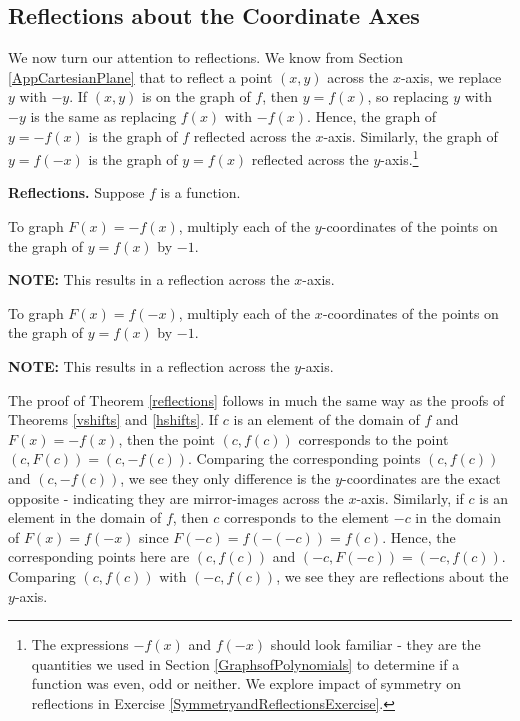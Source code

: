 \documentclass{ximera}
\begin{document}
\subsection{Reflections about the Coordinate Axes}

We now turn our attention to reflections. We know from Section \ref{AppCartesianPlane} that to reflect a point $(x,y)$ across the $x$-axis, we replace $y$ with $-y$.  If $(x,y)$ is on the graph of $f$, then $y=f(x)$, so replacing $y$ with $-y$ is the same as replacing $f(x)$ with $-f(x)$.  Hence, the graph of $y=-f(x)$ is the graph of $f$ reflected across the $x$-axis.  Similarly, the graph of $y=f(-x)$ is the graph of $y = f(x)$ reflected across the $y$-axis.\footnote{The expressions $-f(x)$ and $f(-x)$ should look familiar - they are the quantities we used in Section \ref{GraphsofPolynomials} to determine if a function was even, odd or neither.  We explore impact of symmetry on reflections in Exercise \ref{SymmetryandReflectionsExercise}.}   

\smallskip

\colorbox{ResultColor}{\bbm


\begin{theorem} \label{reflections}\textbf{Reflections.}  Suppose $f$ is a function. 

  To graph $F(x)=-f(x)$,  multiply each of the $y$-coordinates of the points on the graph of $y=f(x)$ by $-1$.

\textbf{NOTE:}  This results in a reflection across the $x$-axis.

To graph $F(x)=f(-x)$,  multiply each of the $x$-coordinates of the points on the graph of $y=f(x)$ by $-1$.

\textbf{NOTE:}  This results in a reflection across the $y$-axis.


\end{theorem}

\ebm}

\smallskip

The proof of Theorem \ref{reflections} follows in much the same way as the proofs of Theorems \ref{vshifts} and \ref{hshifts}.  If $c$ is an element of the domain of $f$ and $F(x) = -f(x)$,  then the point $(c, f(c))$ corresponds to the point $(c, F(c)) = (c,-f(c))$.  Comparing the corresponding points $(c, f(c))$ and $(c, -f(c))$, we see they only difference is the $y$-coordinates are the exact opposite - indicating they are mirror-images across the $x$-axis.  Similarly, if $c$ is an element in the domain of $f$, then $c$ corresponds to the element $-c$ in the domain of $F(x) = f(-x)$ since $F(-c) = f(-(-c)) = f(c)$. Hence, the corresponding points here are $(c, f(c))$ and $(-c, F(-c)) = (-c, f(c))$.  Comparing $(c, f(c))$ with $(-c, f(c))$, we see they are reflections about the $y$-axis.
\end{document}
